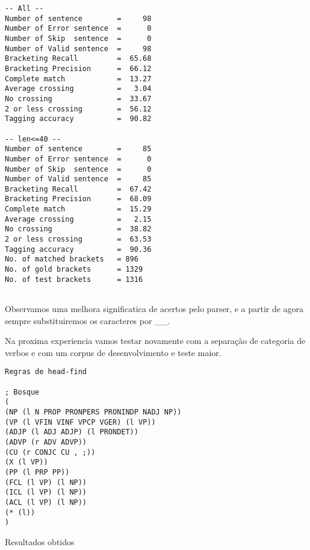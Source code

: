 \begin{verbatim}
-- All --
Number of sentence        =     98
Number of Error sentence  =      0
Number of Skip  sentence  =      0
Number of Valid sentence  =     98
Bracketing Recall         =  65.68
Bracketing Precision      =  66.12
Complete match            =  13.27
Average crossing          =   3.04
No crossing               =  33.67
2 or less crossing        =  56.12
Tagging accuracy          =  90.82

-- len<=40 --
Number of sentence        =     85
Number of Error sentence  =      0
Number of Skip  sentence  =      0
Number of Valid sentence  =     85
Bracketing Recall         =  67.42
Bracketing Precision      =  68.09
Complete match            =  15.29
Average crossing          =   2.15
No crossing               =  38.82
2 or less crossing        =  63.53
Tagging accuracy          =  90.36
No. of matched brackets   = 896
No. of gold brackets      = 1329
No. of test brackets      = 1316


\end{verbatim}

\normalsize

Observamos uma melhora significatica de acertos pelo parser, e a partir de agora sempre substituiremos os caracteres \-\- por \_\_.

Na proxima experiencia vamos testar novamente com a separação de categoria de verbos e com um corpus de desenvolvimento e teste maior.

\scriptsize

\begin{verbatim}
Regras de head-find

; Bosque
(
(NP (l N PROP PRONPERS PRONINDP NADJ NP))
(VP (l VFIN VINF VPCP VGER) (l VP))
(ADJP (l ADJ ADJP) (l PRONDET))
(ADVP (r ADV ADVP))
(CU (r CONJC CU , ;))
(X (l VP))
(PP (l PRP PP))
(FCL (l VP) (l NP))
(ICL (l VP) (l NP))
(ACL (l VP) (l NP))
(* (l))
)

\end{verbatim}


Resultados obtidos


